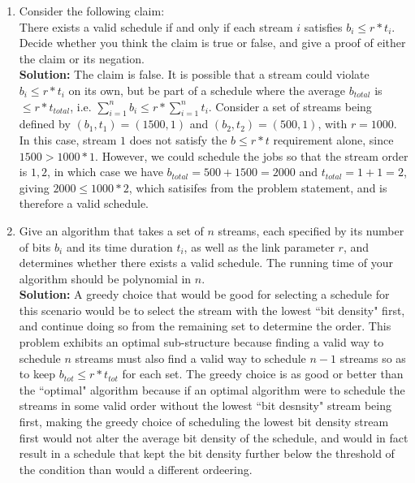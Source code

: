 \documentclass[11pts]{article}
\begin{document}
\begin{enumerate}
  \begin{enumerate}
  \item Consider the following claim: \\
  There exists a valid schedule if and only if each stream $i$ satisfies
  $b_i \le r * t_i$. \\
  Decide whether you think the claim is true or false, and give a proof
  of either the claim or its negation. \\

  \textbf{Solution:} The claim is false. It is possible that a stream could
  violate $b_i \le r * t_i$ on its own, but be part of a schedule where the
  average $b_{total}$ is $\le r * t_{total}$, i.e.
  $\sum_{i=1}^{n}{b_i} \le r*\sum_{i=1}^{n}{t_i}$. Consider a
  set of streams being defined by $(b_1, t_1) = (1500, 1)$ and
  $(b_2, t_2) = (500, 1)$, with $r = 1000$.
  In this case, stream $1$ does not satisfy the $b \le r*t$ requirement alone,
  since $ 1500 > 1000 * 1 $. However, we could schedule the jobs so that the
  stream order is $1, 2$, in which case we have $b_{total} = 500 + 1500 = 2000$
  and $t_{total} = 1 + 1 = 2$, giving $2000 \le 1000 * 2$, which
  satisifes \text{(*)} from the problem statement, and is therefore a valid
  schedule. \\

  \item Give an algorithm that takes a set of $n$ streams, each specified
  by its number of bits $b_i$ and its time duration $t_i$, as well as
  the link parameter $r$, and determines whether there exists a
  valid schedule. The running time of your algorithm should
  be polynomial in $n$. \\

  \textbf{Solution:} A greedy choice that would be good for selecting a
  schedule for this scenario would be to select the stream with the lowest
  ``bit density" first, and continue doing so from the remaining set to
  determine the order. This problem exhibits an optimal sub-structure because
  finding a valid way to schedule $n$ streams must also find a valid way to
  schedule $n - 1$ streams so as to keep $b_{tot} \le r*t_{tot}$ for each
  set. The greedy choice is as good or better than the ``optimal" algorithm
  because if an optimal algorithm were to schedule the streams in some valid
  order without the lowest ``bit desnsity" stream being first, making the
  greedy choice of scheduling the lowest bit density stream first would not
  alter the average bit density of the schedule, and would in fact result
  in a schedule that kept the bit density further below the threshold of
  the condition than would a different ordeering. \\
  

\end{enumerate}
\end{enumerate}
\end{document}
